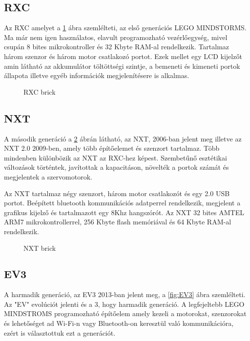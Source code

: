 \subsection{RXC}

Az RXC amelyet a \ref{fig:RXC} ábra szemlélteti, az első generációs LEGO MINDSTORMS. Ma már nem igen használatos, elavult programozható vezérlőegység, mivel csupán 8 bites mikrokontroller és 32 Kbyte RAM-al rendelkezik. Tartalmaz három szenzor és három motor csatlakozó portot. Ezek mellet egy LCD kijelzőt amin látható az akkumulátor töltöttségi szintje, a bemeneti és kimeneti portok állapota illetve egyéb információk megjelenítésere is alkalmas.

\begin{figure}[!htb]
	\label{fig:RXC}
	\centering
	\caption{RXC brick}
\end{figure}

\subsection{NXT}
A második generáció a \ref{fig:NXT} ábrán látható, az NXT, 2006-ban jelent meg illetve az NXT 2.0 2009-ben, amely több építőelemet és szenzort tartalmaz. Több mindenben különbözik az NXT az RXC-hez képest. Szembetűnő esztétikai változások történtek, javítottak a kapacitáson, növelték a portok számát és megjelentek a szervomotorok.

Az NXT tartalmaz négy szenzort, három motor csatlakozót és egy 2.0 USB portot. Beépített bluetooth kommunikációs adatperrel rendelkezik, megjelent a grafikus kijelző és tartalmazott egy 8Khz hangszórót. Az NXT 32 bites AMTEL ARM7 mikrokontrollerrel, 256 Kbyte flash memóriával és 64 Kbyte RAM-al rendelkezik.

\begin{figure}[!htb]
	\label{fig:NXT}
	\centering
	\caption{NXT brick}
\end{figure}

\subsection{EV3}
A harmadik generáció, az EV3 2013-ban jelent meg, a \ref{fig:EV3} ábra szemlélteti. Az "EV" evolúciót jelenti és a 3, hogy harmadik generáció. A legfejeltebb LEGO MINDSTROMS programozható építőelem amely kezeli a motorokat, szenzorokat és lehetőséget ad Wi-Fi-n vagy Bluetooth-on keresztül való kommunikációra, ezért is választottuk ezt a generációt.


